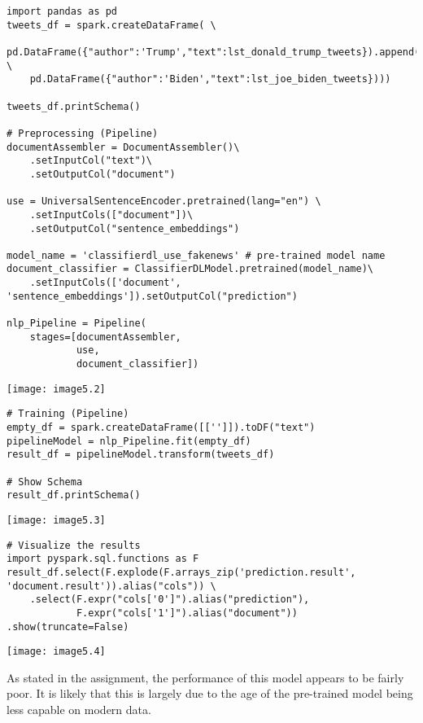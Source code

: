 \documentclass[]{article}
\begin{document}
\begin{verbatim}
import pandas as pd
tweets_df = spark.createDataFrame( \
	pd.DataFrame({"author":'Trump',"text":lst_donald_trump_tweets}).append( \
	pd.DataFrame({"author":'Biden',"text":lst_joe_biden_tweets})))

tweets_df.printSchema()

# Preprocessing (Pipeline)
documentAssembler = DocumentAssembler()\
	.setInputCol("text")\
	.setOutputCol("document")

use = UniversalSentenceEncoder.pretrained(lang="en") \
	.setInputCols(["document"])\
	.setOutputCol("sentence_embeddings")

model_name = 'classifierdl_use_fakenews' # pre-trained model name
document_classifier = ClassifierDLModel.pretrained(model_name)\
	.setInputCols(['document', 
'sentence_embeddings']).setOutputCol("prediction")

nlp_Pipeline = Pipeline(
	stages=[documentAssembler, 
			use,
			document_classifier])
\end{verbatim}
\texttt{[image: image5.2]} %

\begin{verbatim}
# Training (Pipeline)
empty_df = spark.createDataFrame([['']]).toDF("text")
pipelineModel = nlp_Pipeline.fit(empty_df)
result_df = pipelineModel.transform(tweets_df)

# Show Schema
result_df.printSchema()
\end{verbatim}
\texttt{[image: image5.3]} %


\begin{verbatim}
# Visualize the results
import pyspark.sql.functions as F
result_df.select(F.explode(F.arrays_zip('prediction.result', 
'document.result')).alias("cols")) \
	.select(F.expr("cols['0']").alias("prediction"),
			F.expr("cols['1']").alias("document")) .show(truncate=False)
\end{verbatim}
\texttt{[image: image5.4]} %

As stated in the assignment, the performance of this model appears to be fairly poor. It is likely that this is largely due to the age of the pre-trained model being less capable on modern data.
\end{document}
